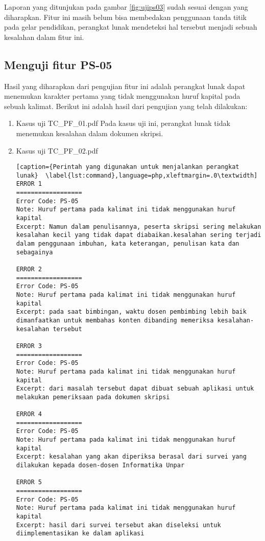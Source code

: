 Laporan yang ditunjukan pada gambar \ref{fig:ujips03} sudah sesuai dengan yang diharapkan. Fitur ini masih belum bisa membedakan penggunaan tanda titik pada gelar pendidikan, perangkat lunak mendeteksi hal tersebut menjadi sebuah kesalahan dalam fitur ini.

\subsection{Menguji fitur PS-05}
Hasil yang diharapkan dari pengujian fitur ini adalah perangkat lunak dapat menemukan karakter pertama yang tidak menggunakan huruf kapital pada sebuah kalimat. Berikut ini adalah hasil dari pengujian yang telah dilakukan:

\begin{enumerate}
	\item Kasus uji TC\_PF\_01.pdf
	Pada kasus uji ini, perangkat lunak tidak menemukan kesalahan dalam dokumen skripsi.
	
	\item Kasus uji TC\_PF\_02.pdf
	
\begin{lstlisting}[caption={Perintah yang digunakan untuk menjalankan perangkat lunak}	\label{lst:command},language=php,xleftmargin=.0\textwidth]
ERROR 1
==================
Error Code: PS-05
Note: Huruf pertama pada kalimat ini tidak menggunakan huruf kapital
Excerpt: Namun dalam penulisannya, peserta skripsi sering melakukan kesalahan kecil yang tidak dapat diabaikan.kesalahan sering terjadi dalam penggunaan imbuhan, kata keterangan, penulisan kata dan sebagainya

ERROR 2
==================
Error Code: PS-05
Note: Huruf pertama pada kalimat ini tidak menggunakan huruf kapital
Excerpt: pada saat bimbingan, waktu dosen pembimbing lebih baik dimanfaatkan untuk membahas konten dibanding memeriksa kesalahan-kesalahan tersebut

ERROR 3
==================
Error Code: PS-05
Note: Huruf pertama pada kalimat ini tidak menggunakan huruf kapital
Excerpt: dari masalah tersebut dapat dibuat sebuah aplikasi untuk melakukan pemeriksaan pada dokumen skripsi

ERROR 4
==================
Error Code: PS-05
Note: Huruf pertama pada kalimat ini tidak menggunakan huruf kapital
Excerpt: kesalahan yang akan diperiksa berasal dari survei yang dilakukan kepada dosen-dosen Informatika Unpar

ERROR 5
==================
Error Code: PS-05
Note: Huruf pertama pada kalimat ini tidak menggunakan huruf kapital
Excerpt: hasil dari survei tersebut akan diseleksi untuk diimplementasikan ke dalam aplikasi


\end{lstlisting}
\end{enumerate}
